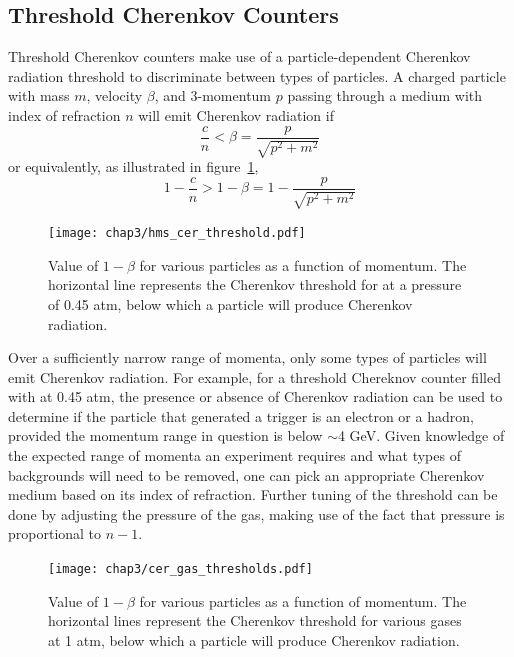 \subsection{Threshold Cherenkov Counters}
Threshold Cherenkov counters make use of a particle-dependent Cherenkov
radiation threshold to discriminate between types of particles.
A charged particle with mass $m$, velocity $\beta$, and 3-momentum $p$ passing
through a medium with index of refraction $n$ will emit Cherenkov radiation if
\begin{equation}
    \frac{c}{n} < \beta = \frac{p}{\sqrt{p^2+m^2}}
\end{equation}
or equivalently, as illustrated in figure~\ref{fig:hms_cer_threshold},
\begin{equation}
    1-\frac{c}{n} > 1-\beta = 1-\frac{p}{\sqrt{p^2+m^2}}
\end{equation}

\begin{figure}[!h]
    \centering
    \texttt{[image: chap3/hms\_cer\_threshold.pdf]}
    \caption[Value of $1-\beta$ for various particles as a function of
            momentum.]{Value of $1-\beta$ for various particles as a function of
            momentum. The horizontal line represents the Cherenkov threshold
            for  at a pressure of 0.45 atm, below which a particle
            will produce Cherenkov radiation.
            }
    \label{fig:hms_cer_threshold}
\end{figure}

Over a sufficiently narrow range of momenta, only some types of particles will
emit Cherenkov radiation.
For example, for a threshold Chereknov counter filled with  at
0.45 atm, the presence or absence of Cherenkov radiation can be used to
determine if the particle that generated a trigger is an electron or a hadron,
provided the momentum range in question is below $\sim$4 \si{\giga\eV}.
Given knowledge of the expected range of momenta an experiment requires and
what types of backgrounds will need to be removed, one can pick an appropriate
Cherenkov medium based on its index of refraction. Further tuning of the
threshold can be done by adjusting the pressure of the gas, making use of
the fact that pressure is proportional to $n-1$.

\begin{figure}[!h]
    \centering
    \texttt{[image: chap3/cer\_gas\_thresholds.pdf]}
    \caption{Value of $1-\beta$ for various particles as a function of
            momentum. The horizontal lines represent the Cherenkov threshold
            for various gases at 1 atm, below which a particle
            will produce Cherenkov radiation.
            }
    \label{fig:cer_gas_threshold}
\end{figure}


